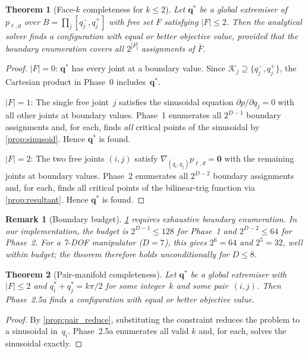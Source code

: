 \documentclass[journal]{IEEEtran}
\newtheorem{theorem}{Theorem}
\newtheorem{remark}{Remark}
\begin{document}
\begin{theorem}[Face-$k$ completeness for $k \leq 2$]\label{thm:face_complete}
Let $\bm{q}^*$ be a global extremiser of $p_{\ell,d}$ over
$B = \prod_j [q_j^-,q_j^+]$ with free set $F$ satisfying $|F|\leq 2$.
Then the analytical solver finds a configuration with equal or
better objective value, provided that the boundary enumeration
covers all $2^{|\bar F|}$ assignments of $\bar F$.
\end{theorem}
\begin{proof}
$|F|=0$:
$\bm{q}^*$ has every joint at a boundary value.
Since $\mathcal{K}_j \supseteq \{q_j^-,q_j^+\}$, the Cartesian product
in Phase~0 includes~$\bm{q}^*$.

$|F|=1$:
The single free joint~$j$ satisfies the sinusoidal
equation $\partial p/\partial q_j = 0$ with all other joints at
boundary values.
Phase~1 enumerates all $2^{D-1}$ boundary assignments and, for each,
finds \emph{all} critical points of the sinusoidal
by \cref{prop:sinusoid}.
Hence $\bm{q}^*$ is found.

$|F|=2$:
The two free joints $(i,j)$ satisfy
$\nabla_{(q_i,q_j)} p_{\ell,d} = \bm{0}$ with the
remaining joints at boundary values.
Phase~2 enumerates all $2^{D-2}$ boundary assignments and, for each,
finds all critical points of the bilinear-trig function via
\cref{prop:resultant}.
Hence $\bm{q}^*$ is found.
\end{proof}

\begin{remark}[Boundary budget]\label{rem:budget}
\cref{thm:face_complete} requires exhaustive boundary enumeration.
In our implementation, the budget is $2^{D-1} \leq 128$ for Phase~1
and $2^{D-2} \leq 64$ for Phase~2.
For a 7-DOF manipulator ($D=7$), this gives $2^6=64$ and $2^5=32$,
well within budget; the theorem therefore holds unconditionally for
$D\leq 8$.
\end{remark}

\begin{theorem}[Pair-manifold completeness]\label{thm:pair_complete}
Let $\bm{q}^*$ be a global extremiser with
$|F| \leq 2$ and $q_i^* + q_j^* = k\pi/2$ for some integer~$k$ and
some pair~$(i,j)$.
Then Phase~2.5a finds a configuration with equal or better objective
value.
\end{theorem}
\begin{proof}
By \cref{prop:pair_reduce}, substituting the constraint reduces the
problem to a sinusoidal in~$q_i$.
Phase~2.5a enumerates all valid $k$ and, for each, solves the
sinusoidal exactly.
\end{proof}
\end{document}
